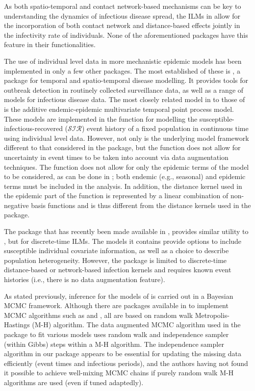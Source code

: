 \documentclass[nojss,shortnames]{jss}
\begin{document}
As both spatio-temporal and contact network-based mechanisms can be key to understanding the dynamics of infectious disease spread, the ILMs in  allow for the incorporation of both contact network and distance-based effects jointly in the infectivity rate of individuals. None of the aforementioned packages have this feature in their functionalities. 

The use of individual level data in more mechanistic epidemic models has been implemented in only a few other  packages. 
The most established of these is  \citep{surveillance1,surveillance2}, a package for temporal and spatio-temporal disease modelling. It provides tools for outbreak detection in routinely collected surveillance data, as well as a range of models for infectious disease data. The most closely related model in  to those of  is the additive endemic-epidemic multivariate temporal point process model.
These models are implemented in the  function for modelling the susceptible-infectious-recovered ($\mathcal{SIR}$) event history of a fixed population in continuous time using individual level data. 
However, not only is the underlying model framework different to that considered in the  package, but the  function does not allow for uncertainty in event times to be taken into account via data augmentation techniques. The function does not allow for only the epidemic terms of the model to be considered, as can be done in ; both endemic (e.g., seasonal) and epidemic terms must be included in the analysis. In addition, the distance kernel used in the epidemic part of the  function is represented by a linear combination of non-negative basis functions and is thus different from the distance kernels used in the  package. 

The  package \citep{EpiILM} that has recently been made available in , provides similar utility to , but for discrete-time ILMs. The models it contains provide options to include susceptible individual covariate information, as well as a choice to describe population heterogeneity. However, the package is limited to discrete-time distance-based or network-based infection kernels and requires known event histories (i.e., there is no data augmentation feature). 

As stated previously, inference for the models of  is carried out in a Bayesian MCMC framework.
Although there are packages available in  to implement MCMC algorithms such as  \citep{MCMCpack} and  \citep{adaptmcmc}, all are based on random walk Metropolis-Hastings (M-H) algorithm. The data augmented MCMC algorithm used in the  package to fit various models uses random walk and independence sampler (within Gibbs) steps within a M-H algorithm. The independence sampler algorithm in our package appears to be essential for updating the missing data efficiently (event times and infectious periods), and the authors having not found it possible to achieve well-mixing MCMC chains if purely random walk M-H algorithms are used (even if tuned adaptedly). 
\end{document}
